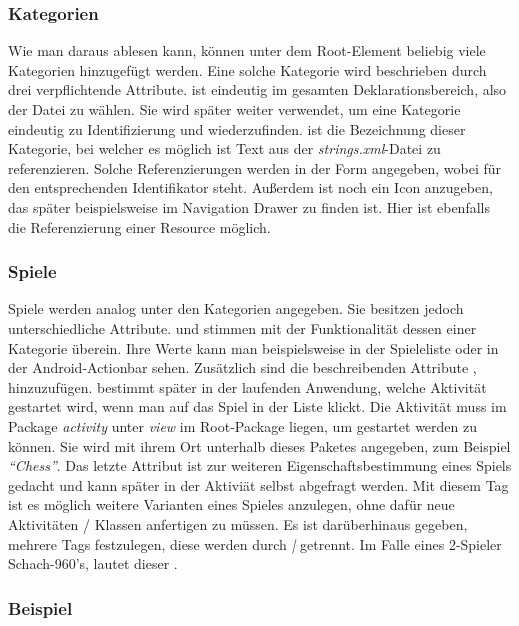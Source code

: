 \subsubsection{Kategorien}

Wie man daraus ablesen kann, können unter dem Root-Element  beliebig
viele Kategorien hinzugefügt werden. Eine solche Kategorie wird beschrieben
durch drei verpflichtende Attribute.  ist eindeutig im gesamten
Deklarationsbereich, also der Datei zu wählen. Sie wird später weiter verwendet,
um eine Kategorie eindeutig zu Identifizierung und wiederzufinden.  
ist die Bezeichnung dieser Kategorie, bei welcher es möglich ist Text aus der
\emph{strings.xml}-Datei zu referenzieren. Solche Referenzierungen werden in der
Form  angegeben, wobei  für den entsprechenden
Identifikator steht. Außerdem ist noch ein Icon anzugeben, das später
beispielsweise im Navigation Drawer zu finden ist. Hier ist ebenfalls die
Referenzierung einer Resource möglich.

\subsubsection{Spiele}
\label{sssec:games}

Spiele werden analog unter den Kategorien angegeben. Sie besitzen jedoch
unterschiedliche Attribute.  und  stimmen mit der
Funktionalität dessen  einer Kategorie überein. Ihre Werte kann
man beispielsweise in der Spieleliste oder in der Android-Actionbar sehen.
Zusätzlich sind die beschreibenden Attribute , 
hinzuzufügen.  bestimmt später in der laufenden Anwendung, welche
Aktivität gestartet wird, wenn man auf das Spiel in der Liste klickt. Die
Aktivität muss im Package \emph{activity} unter \emph{view} im Root-Package
liegen, um gestartet werden zu können. Sie wird mit ihrem Ort unterhalb dieses
Paketes angegeben, zum Beispiel \emph{``Chess''}. Das letzte Attribut 
ist zur weiteren Eigenschaftsbestimmung eines Spiels gedacht und kann später in
der Aktiviät selbst abgefragt werden. Mit diesem Tag ist es möglich weitere
Varianten eines Spieles anzulegen, ohne dafür neue Aktivitäten / Klassen
anfertigen zu müssen. Es ist darüberhinaus gegeben, mehrere Tags festzulegen,
diese werden durch \emph{|} getrennt. Im Falle eines 2-Spieler Schach-960's,
lautet dieser .

\subsubsection{Beispiel}

